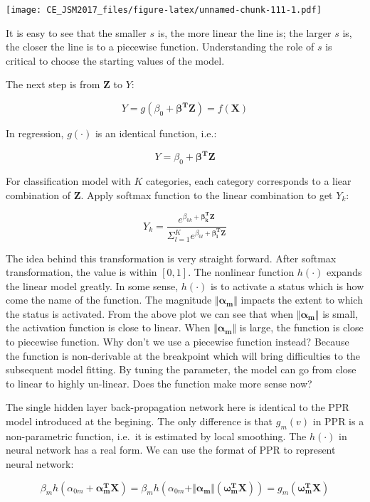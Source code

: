 \documentclass[]{book}
\theoremstyle{definition}
\theoremstyle{definition}
\theoremstyle{remark}
\begin{document}
\texttt{[image: CE\_JSM2017\_files/figure-latex/unnamed-chunk-111-1.pdf]}

It is easy to see that the smaller \(s\) is, the more linear the line
is; the larger \(s\) is, the closer the line is to a piecewise function.
Understanding the role of \(s\) is critical to choose the starting
values of the model.

The next step is from \(\mathbf{Z}\) to \(Y\):

\[Y=g(\beta_{0}+\mathbf{\beta^{T}Z})=f(\mathbf{X})\]

In regression, \(g(\cdot)\) is an identical function, i.e.:

\[Y=\beta_{0}+\mathbf{\beta^{T}Z}\]

For classification model with \(K\) categories, each category
corresponds to a liear combination of \(\mathbf{Z}\). Apply softmax
function to the linear combination to get \(Y_{k}\):

\[Y_{k}=\frac{e^{\beta_{0k}+\mathbf{\beta_{k}^{T}Z}}}{\Sigma_{l=1}^{K}e^{\beta_{0l}+\mathbf{\beta_{l}^{T}Z}}}\]

The idea behind this transformation is very straight forward. After
softmax transformation, the value is within \([0,1]\). The nonlinear
function \(h(\cdot)\) expands the linear model greatly. In some sense,
\(h(\cdot)\) is to activate a status which is how come the name of the
function. The magnitude \(\Vert\mathbf{\alpha_{m}}\Vert\) impacts the
extent to which the status is activated. From the above plot we can see
that when \(\Vert\mathbf{\alpha_{m}}\Vert\) is small, the activation
function is close to linear. When \(\Vert\mathbf{\alpha_{m}}\Vert\) is
large, the function is close to piecewise function. Why don't we use a
piecewise function instead? Because the function is non-derivable at the
breakpoint which will bring difficulties to the subsequent model
fitting. By tuning the parameter, the model can go from close to linear
to highly un-linear. Does the function make more sense now?

The single hidden layer back-propagation network here is identical to
the PPR model introduced at the begining. The only difference is that
\(g_m(v)\) in PPR is a non-parametric function, i.e.~it is estimated by
local smoothing. The \(h(\cdot)\) in neural network has a real form. We
can use the format of PPR to represent neural network:

\[\beta_{m}h(\alpha_{0m}+\mathbf{\alpha_{m}^{T}X})=\beta_{m}h(\alpha_{0m}+\Vert\mathbf{\alpha_{m}}\Vert(\mathbf{\omega_{m}^{T}X}))=g_{m}(\mathbf{\omega_{m}^{T}X})\]
\end{document}

